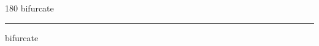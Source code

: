 
\begin{frame}
\begin{center}
\begin{turn}{180}
{\fontsize{2.5cm}{1em}\selectfont bifurcate}
\end{turn}
\vspace{1em}\par  
\hrule
\vspace{1em}\par  
{\fontsize{2.5cm}{1em}\selectfont bifurcate}
\end{center}
\end{frame}
